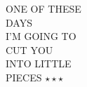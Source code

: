 \documentclass[20pt]{book}
\begin{document}
\clearpage



\clearpage

\vspace*{\fill}
\begin{minipage}{\textwidth}
\large
{}
\end{minipage}
\vspace{\fill}


\clearpage


\clearpage

\clearpage

\clearpage

\clearpage

\clearpage

\clearpage

\newpage
\thispagestyle{empty}
\mbox{}
\newpage

\vspace*{\fill}
\begin{minipage}{\textwidth}
\center
{
ONE OF THESE\\
DAYS\\
I’M GOING TO\\
CUT YOU\\
INTO LITTLE\\
PIECES \small{$\star \star \star$}
}
\end{minipage}
\vspace{\fill}
\end{document}
